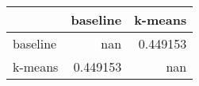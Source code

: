 \begin{tabular}{lrr}
\toprule
          &   baseline &    k-means \\
\midrule
 baseline & nan        &   0.449153 \\
 k-means  &   0.449153 & nan        \\
\bottomrule
\end{tabular}